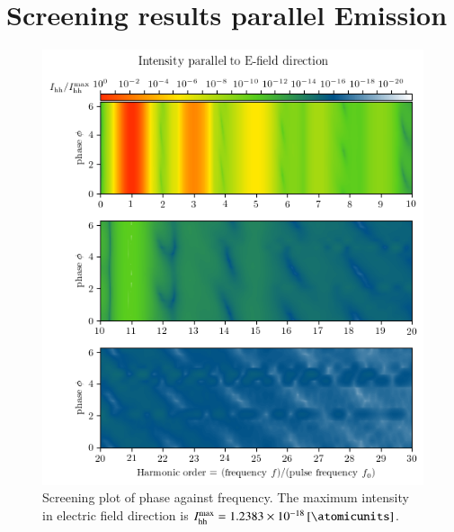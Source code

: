 \documentclass[11pt, a4paper]{scrartcl}
\begin{document}
\section{Screening results parallel Emission}
\begin{figure}[H]
    \centering
    \includegraphics[width=\textwidth]{phase=variable_E_dir_plot.png}
    \caption{Screening plot of phase against frequency. The maximum intensity in electric
      field direction is $I_{\mathrm{hh}}^{\mathrm{max}} = \SI{1.2383e-18}{[\atomicunits]}$.}
    \label{fig:sec1_parallel_screening}
\end{figure}
\end{document}

